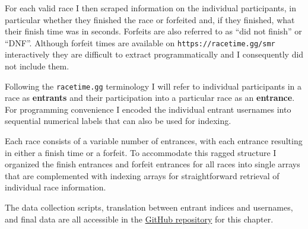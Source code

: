 \documentclass[
  letterpaper,
  DIV=11,
  numbers=noendperiod]{scrartcl}
\begin{document}
For each valid race I then scraped information on the individual
participants, in particular whether they finished the race or forfeited
and, if they finished, what their finish time was in seconds. Forfeits
are also referred to as ``did not finish'' or ``DNF''. Although forfeit
times are available on \texttt{https://racetime.gg/smr} interactively
they are difficult to extract programmatically and I consequently did
not include them.

Following the \texttt{racetime.gg} terminology I will refer to
individual participants in a race as \textbf{entrants} and their
participation into a particular race as an \textbf{entrance}. For
programming convenience I encoded the individual entrant usernames into
sequential numerical labels that can also be used for indexing.

Each race consists of a variable number of entrances, with each entrance
resulting in either a finish time or a forfeit. To accommodate this
ragged structure I organized the finish entrances and forfeit entrances
for all races into single arrays that are complemented with indexing
arrays for straightforward retrieval of individual race information.

The data collection scripts, translation between entrant indices and
usernames, and final data are all accessible in the
\href{https://github.com/betanalpha/quarto_chapters/tree/main/case_studies/racing/data}{GitHub
repository} for this chapter.
\end{document}
